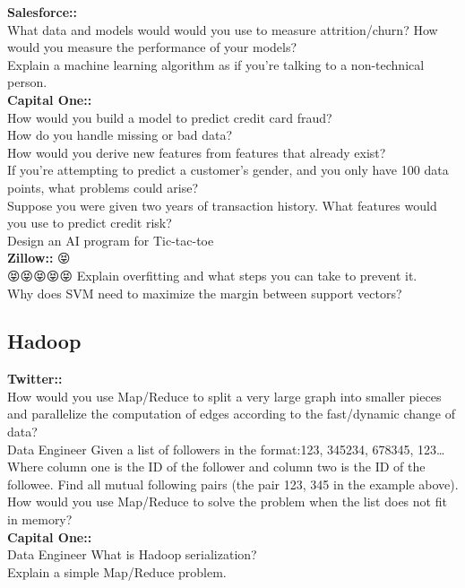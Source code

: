 \documentclass[11pt]{article}
\begin{document}
{\bf Salesforce:: }\\
What data and models would would you use to measure attrition/churn? How would you measure the performance of your models?\\
Explain a machine learning algorithm as if you’re talking to a non-technical person. \\

{\bf Capital One:: }\\
How would you build a model to predict credit card fraud?\\
How do you handle missing or bad data?\\
How would you derive new features from features that already exist?\\
If you’re attempting to predict a customer’s gender, and you only have 100 data points, what problems could arise?\\
Suppose you were given two years of transaction history. What features would you use to predict credit risk?\\
Design an AI program for Tic-tac-toe \\

{\bf Zillow:: }😝 \\ 😝😝😝😝😝
Explain overfitting and what steps you can take to prevent it.\\
Why does SVM need to maximize the margin between support vectors?\\


\subsection{Hadoop}
{\bf Twitter:: }\\
How would you use Map/Reduce to split a very large graph into smaller pieces and parallelize the computation of edges according to the fast/dynamic change of data?\\
Data Engineer Given a list of followers in the format:123, 345234, 678345, 123…Where column one is the ID of the follower and column two is the ID of the followee. Find all mutual following pairs (the pair 123, 345 in the example above). How would you use Map/Reduce to solve the problem when the list does not fit in memory?\\

{\bf Capital One:: }\\
Data Engineer What is Hadoop serialization?\\
Explain a simple Map/Reduce problem.\\
\end{document}
